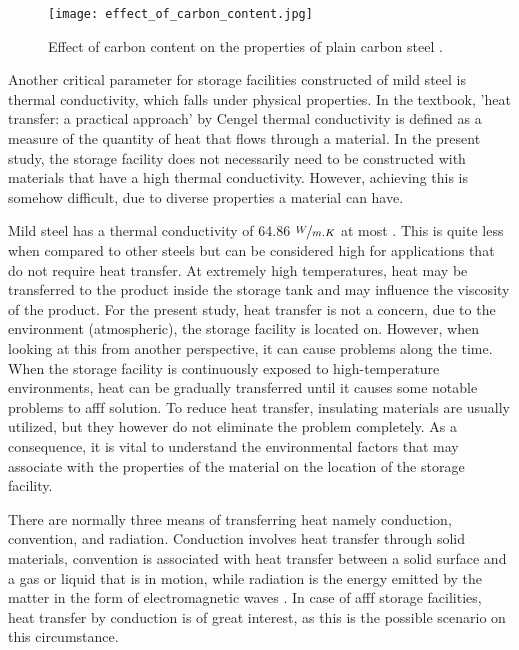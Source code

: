 \begin{figure}[H]
    \centering
    \texttt{[image: effect\_of\_carbon\_content.jpg]}
    \caption{Effect of carbon content on the properties of plain carbon steel \cite{timings2008fabrication}.}
    \label{ch3:figure:carbon}
\end{figure}

Another critical parameter for storage facilities constructed of mild steel is thermal conductivity, which falls under physical properties. In the textbook, 'heat transfer: a practical approach' by Cengel \cite{cengel1998heat} thermal conductivity is defined as a measure of the quantity of heat that flows through a material. In the present study, the storage facility does not necessarily need to be constructed with materials that have a high thermal conductivity. However, achieving this is somehow difficult, due to diverse properties a material can have.

Mild steel has a thermal conductivity of 64.86 $\nicefrac{W}{m.K}$ at most \cite{cengel1998heat}. This is quite less when compared to other steels but can be considered high for applications that do not require heat transfer. At extremely high temperatures, heat may be transferred to the product inside the storage tank and may influence the viscosity of the product. For the present study, heat transfer is not a concern, due to the environment (atmospheric), the storage facility is located on. However, when looking at this from another perspective, it can cause problems along the time. When the storage facility is continuously exposed to high-temperature environments, heat can be gradually transferred until it causes some notable problems to \acrshort{afff} solution. To reduce heat transfer, insulating materials are usually utilized, but they however do not eliminate the problem completely. As a consequence, it is vital to understand the environmental factors that may associate with the properties of the material on the location of the storage facility.

There are normally three means of transferring heat namely conduction, convention, and radiation. Conduction involves heat transfer through solid materials, convention is associated with heat transfer between a solid surface and a gas or liquid that is in motion, while radiation is the energy emitted by the matter in the form of electromagnetic waves \cite{cengel1998heat}. In case of \acrshort{afff} storage facilities, heat transfer by conduction is of great interest, as this is the possible scenario on this circumstance.   

